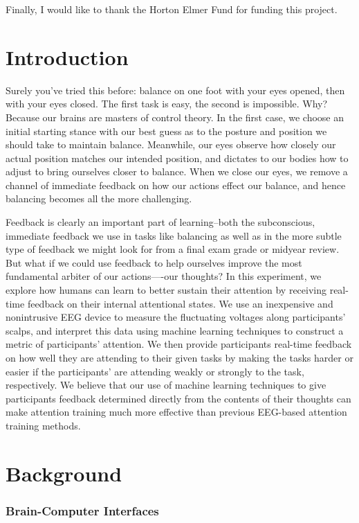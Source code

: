 \documentclass[12pt]{report}
\begin{document}
	Finally, I would like to thank the Horton Elmer Fund for funding this project.  
   
\tableofcontents

\chapter{Introduction}
	Surely you've tried this before: balance on one foot with your eyes opened, then with your eyes closed.  The first task is easy, the second is impossible.  Why?  Because our brains are masters of control theory.  In the first case, we choose an initial starting stance with our best guess as to the posture and position we should take to maintain balance.  Meanwhile, our eyes observe how closely our actual position matches our intended position, and dictates to our bodies how to adjust to bring ourselves closer to balance.  When we close our eyes, we remove a channel of immediate feedback on how our actions effect our balance, and hence balancing becomes all the more challenging.

	Feedback is clearly an important part of learning--both the subconscious, immediate feedback we use in tasks like balancing as well as in the more subtle type of feedback we might look for from a final exam grade or midyear review.  But what if we could use feedback to help ourselves improve the most fundamental arbiter of our actions—-our thoughts?  In this experiment, we explore how humans can learn to better sustain their attention by receiving real-time feedback on their internal attentional states.  We use an inexpensive and nonintrusive EEG device to measure the fluctuating voltages along participants’ scalps, and interpret this data using machine learning techniques to construct a metric of participants’ attention.  We then provide participants real-time feedback on how well they are attending to their given tasks by making the tasks harder or easier if the participants’ are attending weakly or strongly to the task, respectively.  We believe that our use of machine learning techniques to give participants feedback determined directly from the contents of their thoughts can make attention training much more effective than previous EEG-based attention training methods. 

\chapter{Background}

\subsection{Brain-Computer Interfaces}
	
\end{document}
